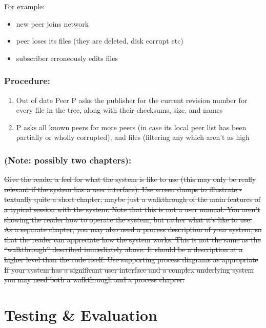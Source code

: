 \documentclass[12pt,a4paper,]{book}
\begin{document}
For example:

\begin{itemize}
\itemsep1pt\parskip0pt
\item
  new peer joins network
\item
  peer loses its files (they are deleted, disk corrupt etc)
\item
  subscriber erroneously edits files
\end{itemize}

\subsubsection{Procedure:}\label{procedure}

\begin{enumerate}
\def\labelenumi{\arabic{enumi}.}
\itemsep1pt\parskip0pt
\item
  Out of date Peer P asks the publisher for the current revision number
  for every file in the tree, along with their checksums, size, and
  names
\item
  P asks all known peers for more peers (in case its local peer list has
  been partially or wholly corrupted), and files (filtering any which
  aren't as high
\end{enumerate}

\subsubsection{(Note: possibly two
chapters):}\label{note-possibly-two-chapters}

\sout{Give the reader a feel for what the system is like to use (this
may only be really relevant if the system has a user interface). Use
screen dumps to illustrate - textually quite a short chapter, maybe just
a walkthrough of the main features of a typical session with the system.
Note that this is not a user manual. You aren't showing the reader how
to operate the system, but rather what it's like to use. As a separate
chapter, you may also need a process description of your system, so that
the reader can appreciate how the system works. This is not the same as
the ``walkthrough'' described immediately above. It should be a
description at a higher level than the code itself. Use supporting
process diagrams as appropriate If your system has a significant user
interface and a complex underlying system you may need both a
walkthrough and a process chapter.}

\section{Testing \& Evaluation}\label{testing-evaluation}
\end{document}
